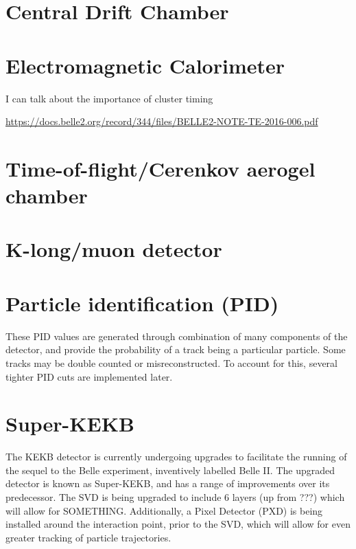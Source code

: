\documentclass[12pt]{thesis}  %
\begin{document}
\section{Central Drift Chamber}



\section{Electromagnetic Calorimeter}

I can talk about the importance of cluster timing

\url{https://docs.belle2.org/record/344/files/BELLE2-NOTE-TE-2016-006.pdf}



\section{Time-of-flight/Cerenkov aerogel chamber}



\section{K-long/muon detector}




\section{Particle identification (PID)}


These PID values are generated through combination of many components of the detector, and provide the probability of a track being a particular particle. Some tracks may be double counted or misreconstructed. To account for this, several tighter PID cuts are implemented later.





\section{Super-KEKB}

The KEKB detector is currently undergoing upgrades to facilitate the running of the sequel to the Belle experiment, inventively labelled Belle II. The upgraded detector is known as Super-KEKB, and has a range of improvements over its predecessor. The SVD is being upgraded to include 6 layers (up from ???) which will allow for SOMETHING. Additionally, a Pixel Detector (PXD) is being installed around the interaction point, prior to the SVD, which will allow for even greater tracking of particle trajectories.
\end{document}
